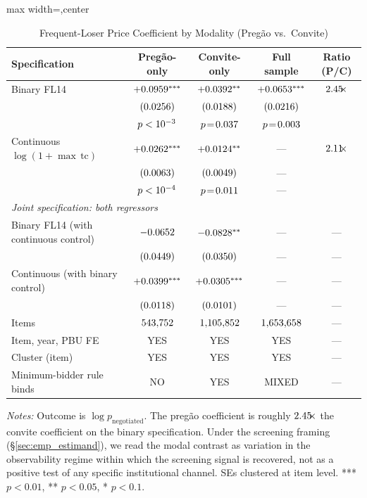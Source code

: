 \begin{table}[htbp]
\centering
\caption{Frequent-Loser Price Coefficient by Modality (Pregão vs.~Convite)}
\label{tab:falsification_modal}
\begin{adjustbox}{max width=\textwidth,center}
\begin{threeparttable}
\small
\begin{tabular}{p{4.5cm}cccc}
\toprule
Specification & Pregão-only & Convite-only & Full sample & Ratio (P/C) \\
\midrule
Binary FL14
  & $+0.0959^{***}$ & $+0.0392^{**}$ & $+0.0653^{***}$ & $2.45\!\!\times$ \\
  & $(0.0256)$ & $(0.0188)$ & $(0.0216)$ & \\
  & $p < 10^{-3}$    & $p\!=\!0.037$    & $p\!=\!0.003$    & \\
\midrule
Continuous $\log(1{+}\max\,\text{tc})$
  & $+0.0262^{***}$ & $+0.0124^{**}$ & --- & $2.11\!\!\times$ \\
  & $(0.0063)$ & $(0.0049)$ & --- & \\
  & $p < 10^{-4}$    & $p\!=\!0.011$    & --- & \\
\midrule
\multicolumn{5}{l}{\emph{Joint specification: both regressors}} \\
Binary FL14 (with continuous control)
  & $-0.0652$ & $-0.0828^{**}$ & --- & --- \\
  & $(0.0449)$ & $(0.0350)$ & --- & --- \\
Continuous (with binary control)
  & $+0.0399^{***}$ & $+0.0305^{***}$ & --- & --- \\
  & $(0.0118)$ & $(0.0101)$ & --- & --- \\
\midrule
Items                       & $543{,}752$ & $1{,}105{,}852$ & $1{,}653{,}658$ & --- \\
Item, year, PBU FE          & YES & YES & YES & --- \\
Cluster (item)              & YES & YES & YES & --- \\
Minimum-bidder rule binds   & NO  & YES & MIXED & --- \\
\bottomrule
\end{tabular}
\begin{tablenotes}
\footnotesize
\item \textit{Notes:} Outcome is $\log p_{\text{negotiated}}$. The
pregão coefficient is roughly $2.45\!\!\times$ the convite
coefficient on the binary specification. Under the screening framing
(\S\ref{sec:emp_estimand}), we read the modal contrast as variation
in the observability regime within which the screening signal is
recovered, not as a positive test of any specific institutional
channel. SEs clustered at item level. *** $p<0.01$, ** $p<0.05$,
* $p<0.1$.
\end{tablenotes}
\end{threeparttable}
\end{adjustbox}
\end{table}
